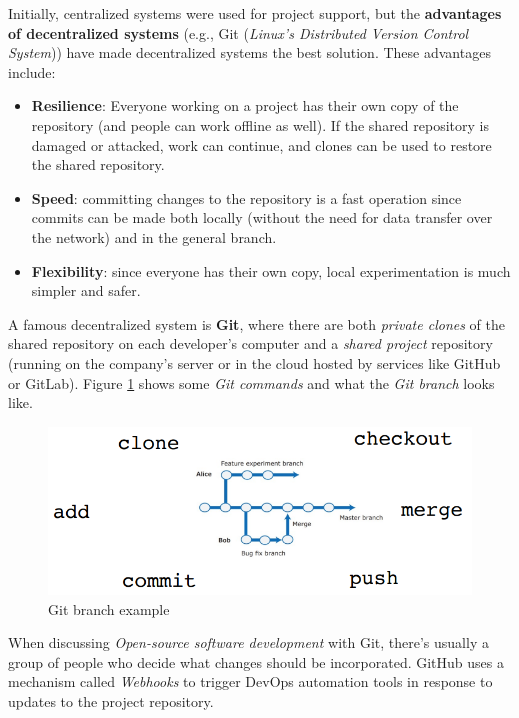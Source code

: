 Initially, centralized systems were used for project support, but the \textbf{advantages of decentralized systems} (e.g., Git (\textit{Linux’s Distributed Version Control System})) have made decentralized systems the best solution. These advantages include:

\begin{itemize}
    \item \textbf{Resilience}: Everyone working on a project has their own copy of the repository (and people can work offline as well). If the shared repository is damaged or attacked, work can continue, and clones can be used to restore the shared repository.
    \item \textbf{Speed}: committing changes to the repository is a fast operation since commits can be made both locally (without the need for data transfer over the network) and in the general branch.
    \item \textbf{Flexibility}: since everyone has their own copy, local experimentation is much simpler and safer.
\end{itemize}

A famous decentralized system is \textbf{Git}, where there are both \textit{private clones} of the shared repository on each developer’s computer and a \textit{shared project} repository (running on the company’s server or in the cloud hosted by services like GitHub or GitLab). Figure \ref{fig:git} shows some \textit{Git commands} and what the \textit{Git branch} looks like.

\begin{figure} [H]
    \centering
    \includegraphics[width=1\textwidth]{images/DevOps/git.PNG}
    \caption{Git branch example}
    \label{fig:git}
\end{figure} 

When discussing \textit{Open-source software development} with Git, there's usually a group of people who decide what changes should be incorporated. GitHub uses a mechanism called \textit{Webhooks} to trigger DevOps automation tools in response to updates to the project repository.

